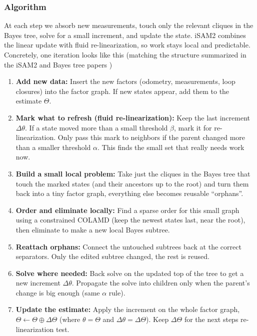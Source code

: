 \subsubsection{Algorithm}
At each step we absorb new measurements, touch only the relevant cliques in the Bayes tree, solve for a small increment, and update the state. \gls{iSAM}2 combines the linear update with fluid re-linearization, so work stays local and predictable. Concretely, one iteration looks like this (matching the structure summarized in the \gls{iSAM}2 and Bayes tree papers \cite{iSAM2_paper,Bayes_tree_for_SLAM_paper})
\begin{enumerate}
    \item \textbf{Add new data:} Insert the new factors (odometry, measurements, loop closures) into the factor graph. If new states appear, add them to the estimate $\Theta$.

    \item \textbf{Mark what to refresh (fluid re-linearization):} Keep the last increment $\Delta\theta$. If a state moved more than a small threshold $\beta$, mark it for re-linearization. Only pass this mark to neighbors if the parent changed more than a smaller threshold $\alpha$. This finds the small set that really needs work now.

    \item \textbf{Build a small local problem:} Take just the cliques in the Bayes tree that touch the marked states (and their ancestors up to the root) and turn them back into a tiny factor graph, everything else becomes reusable ``orphans''.

    \item \textbf{Order and eliminate locally:} Find a sparse order for this small graph using a constrained \gls{COLAMD} (keep the newest states last, near the root), then eliminate to make a new local Bayes subtree.

    \item \textbf{Reattach orphans:} Connect the untouched subtrees back at the correct separators. Only the edited subtree changed, the rest is reused.

    \item \textbf{Solve where needed:} Back solve on the updated top of the tree to get a new increment $\Delta\theta$. Propagate the solve into children only when the parent's change is big enough (same $\alpha$ rule).

    \item \textbf{Update the estimate:} Apply the increment on the whole factor graph, $\Theta \leftarrow \Theta \oplus \Delta\Theta$ (where $\theta = \Theta$ and $\Delta\theta = \Delta\Theta$). Keep $\Delta\Theta$ for the next steps re-linearization test.


\end{enumerate}
